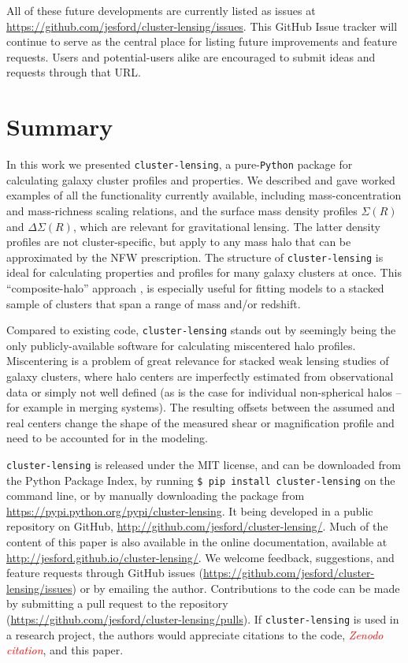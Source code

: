 \documentclass[twocolumn]{aastex6}
\newcommand{\code}{\lstinline[style=codeintext]}
\newcommand{\attn}[2][red]{\textcolor{#1}{\textit{#2}}}
\begin{document}
All of these future developments are currently listed as issues at \url{https://github.com/jesford/cluster-lensing/issues}. This GitHub Issue tracker will continue to serve as the central place for listing future improvements and feature requests. Users and potential-users alike are encouraged to submit ideas and requests through that URL.


\section{Summary}
\label{summary}

In this work we presented \code{cluster-lensing}, a pure-\code{Python} package for calculating galaxy cluster profiles and properties. We described and gave worked examples of all the functionality currently available, including mass-concentration and mass-richness scaling relations, and the surface mass density profiles $\Sigma(R)$ and $\Delta\Sigma(R)$, which are relevant for gravitational lensing. The latter density profiles are not cluster-specific, but apply to any mass halo that can be approximated by the NFW prescription. The structure of \code{cluster-lensing} is ideal for calculating properties and profiles for many galaxy clusters at once. This ``composite-halo'' approach \citep[see {\it e.g.}][]{Ford15}, is especially useful for fitting models to a stacked sample of clusters that span a range of mass and/or redshift.

Compared to existing code, \code{cluster-lensing} stands out by seemingly being the only publicly-available software for calculating miscentered halo profiles. Miscentering is a problem of great relevance for stacked weak lensing studies of galaxy clusters, where halo centers are imperfectly estimated from observational data or simply not well defined (as is the case for individual non-spherical halos -- for example in merging systems). The resulting offsets between the assumed and real centers change the shape of the measured shear or magnification profile and need to be accounted for in the modeling. 

\code{cluster-lensing} is released under the MIT license, and can be downloaded from the Python Package Index, by running \code{$ pip install cluster-lensing} on the command line, or by manually downloading the package from \url{https://pypi.python.org/pypi/cluster-lensing}. It being developed in a public repository on GitHub, \url{http://github.com/jesford/cluster-lensing/}. Much of the content of this paper is also available in the online documentation, available at \url{http://jesford.github.io/cluster-lensing/}. We welcome feedback, suggestions, and feature requests through GitHub issues (\url{https://github.com/jesford/cluster-lensing/issues}) or by emailing the author. Contributions to the code can be made by submitting a pull request to the repository (\url{https://github.com/jesford/cluster-lensing/pulls}). If \code{cluster-lensing} is used in a research project, the authors would appreciate citations to the code, \attn{Zenodo citation}, and this paper.
\end{document}
